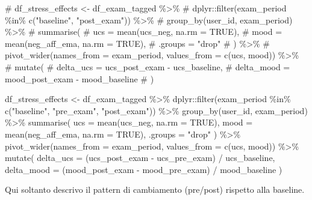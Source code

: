 \documentclass[
  11pt,
  a4paper,
  onecolumn]{article}
\newenvironment{Shaded}{}{}
\newcommand{\AttributeTok}[1]{\textcolor[rgb]{0.84,0.23,0.29}{#1}}
\newcommand{\CommentTok}[1]{\textcolor[rgb]{0.42,0.45,0.49}{#1}}
\newcommand{\ConstantTok}[1]{\textcolor[rgb]{0.00,0.36,0.77}{#1}}
\newcommand{\FunctionTok}[1]{\textcolor[rgb]{0.44,0.26,0.76}{#1}}
\newcommand{\NormalTok}[1]{\textcolor[rgb]{0.14,0.16,0.18}{#1}}
\newcommand{\OtherTok}[1]{\textcolor[rgb]{0.44,0.26,0.76}{#1}}
\newcommand{\SpecialCharTok}[1]{\textcolor[rgb]{0.00,0.36,0.77}{#1}}
\newcommand{\StringTok}[1]{\textcolor[rgb]{0.01,0.18,0.38}{#1}}
\begin{document}
\begin{Shaded}
\begin{Highlighting}[]
\CommentTok{\# df\_stress\_effects \textless{}{-} df\_exam\_tagged \%\textgreater{}\%}
\CommentTok{\#   dplyr::filter(exam\_period \%in\% c("baseline", "post\_exam")) \%\textgreater{}\%}
\CommentTok{\#   group\_by(user\_id, exam\_period) \%\textgreater{}\%}
\CommentTok{\#   summarise(}
\CommentTok{\#     ucs = mean(ucs\_neg, na.rm = TRUE),}
\CommentTok{\#     mood = mean(neg\_aff\_ema, na.rm = TRUE),}
\CommentTok{\#     .groups = "drop"}
\CommentTok{\#   ) \%\textgreater{}\%}
\CommentTok{\#   pivot\_wider(names\_from = exam\_period, values\_from = c(ucs, mood)) \%\textgreater{}\%}
\CommentTok{\#   mutate(}
\CommentTok{\#     delta\_ucs = ucs\_post\_exam {-} ucs\_baseline,}
\CommentTok{\#     delta\_mood = mood\_post\_exam {-} mood\_baseline}
\CommentTok{\#   )}

\NormalTok{df\_stress\_effects }\OtherTok{\textless{}{-}}\NormalTok{ df\_exam\_tagged }\SpecialCharTok{\%\textgreater{}\%}
\NormalTok{  dplyr}\SpecialCharTok{::}\FunctionTok{filter}\NormalTok{(exam\_period }\SpecialCharTok{\%in\%} \FunctionTok{c}\NormalTok{(}\StringTok{"baseline"}\NormalTok{, }\StringTok{"pre\_exam"}\NormalTok{, }\StringTok{"post\_exam"}\NormalTok{)) }\SpecialCharTok{\%\textgreater{}\%}
  \FunctionTok{group\_by}\NormalTok{(user\_id, exam\_period) }\SpecialCharTok{\%\textgreater{}\%}
  \FunctionTok{summarise}\NormalTok{(}
    \AttributeTok{ucs =} \FunctionTok{mean}\NormalTok{(ucs\_neg, }\AttributeTok{na.rm =} \ConstantTok{TRUE}\NormalTok{),}
    \AttributeTok{mood =} \FunctionTok{mean}\NormalTok{(neg\_aff\_ema, }\AttributeTok{na.rm =} \ConstantTok{TRUE}\NormalTok{),}
    \AttributeTok{.groups =} \StringTok{"drop"}
\NormalTok{  ) }\SpecialCharTok{\%\textgreater{}\%}
  \FunctionTok{pivot\_wider}\NormalTok{(}\AttributeTok{names\_from =}\NormalTok{ exam\_period, }\AttributeTok{values\_from =} \FunctionTok{c}\NormalTok{(ucs, mood)) }\SpecialCharTok{\%\textgreater{}\%}
  \FunctionTok{mutate}\NormalTok{(}
    \AttributeTok{delta\_ucs =}\NormalTok{ (ucs\_post\_exam }\SpecialCharTok{{-}}\NormalTok{ ucs\_pre\_exam) }\SpecialCharTok{/}\NormalTok{ ucs\_baseline,}
    \AttributeTok{delta\_mood =}\NormalTok{ (mood\_post\_exam }\SpecialCharTok{{-}}\NormalTok{ mood\_pre\_exam) }\SpecialCharTok{/}\NormalTok{ mood\_baseline}
\NormalTok{  )}
\end{Highlighting}
\end{Shaded}

Qui soltanto descrivo il pattern di cambiamento (pre/post) rispetto alla
baseline.
\end{document}
